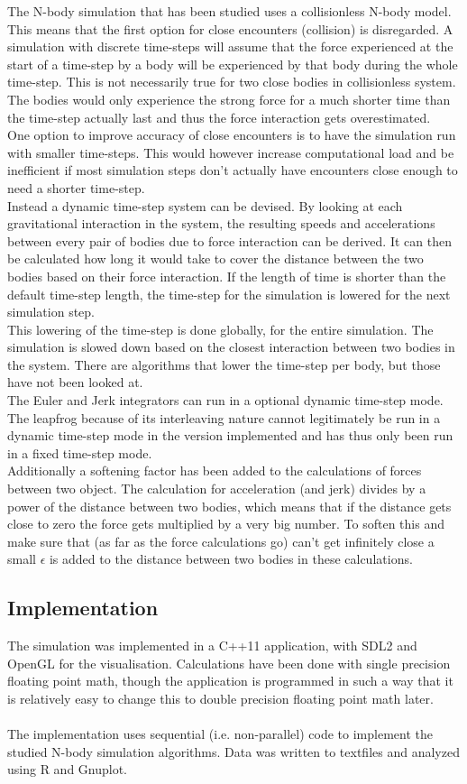 \documentclass[11pt]{article} %
\begin{document}
The N-body simulation that has been studied uses a collisionless N-body model. This means that the first option for close encounters (collision) is disregarded. A simulation with discrete time-steps will assume that the force experienced at the start of a time-step by a body will be experienced by that body during the whole time-step. This is not necessarily true for two close bodies in collisionless system. The bodies would only experience the strong force for a much shorter time than the time-step actually last and thus the force interaction gets overestimated. \\
One option to improve accuracy of close encounters is to have the simulation run with smaller time-steps. This would however increase computational load and be inefficient if most simulation steps don't actually have encounters close enough to need a shorter time-step.\\
Instead a dynamic time-step system can be devised. By looking at each gravitational interaction in the system, the resulting speeds and accelerations between every pair of bodies due to force interaction can be derived. It can then be calculated how long it would take to cover the distance between the two bodies based on their force interaction. If the length of time is shorter than the default time-step length, the time-step for the simulation is lowered for the next simulation step.\\ 
This lowering of the time-step is done globally, for the entire simulation. The simulation is slowed down based on the closest interaction between two bodies in the system. There are algorithms that lower the time-step per body, but those have not been looked at.\\
The Euler and Jerk integrators can run in a optional dynamic time-step mode. The leapfrog because of its interleaving nature cannot legitimately be run in a dynamic time-step mode in the version implemented and has thus only been run in a fixed time-step mode.\\
Additionally a softening factor has been added to the calculations of forces between two object. The calculation for acceleration (and jerk) divides by a power of the distance between two bodies, which means that if the distance gets close to zero the force gets multiplied by a very big number. To soften this and make sure that (as far as the force calculations go) can't get infinitely close a small $\epsilon$ is added to the distance between two bodies in these calculations.
\subsection{Implementation}
The simulation was implemented in a C++11 application, with SDL2 and OpenGL for the visualisation. Calculations have been done with single precision floating point math, though the application is programmed in such a way that it is relatively easy to change this to double precision floating point math later. \\\\
The implementation uses sequential (i.e. non-parallel) code to implement the studied N-body simulation algorithms. Data was written to textfiles and analyzed using R and Gnuplot.
\end{document}
